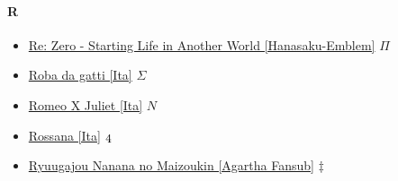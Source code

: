 		\paragraph{R} \hypertarget{SR}{}
			\begin{itemize}
				
				\item \href{https://mega.nz/#F!kHxUTAAY!Z3q-tmj_-emIkQwzSx7dAg} {Re: Zero - Starting Life in Another World [Hanasaku-Emblem]}  $\varPi$ \\ 
				\item \href{https://mega.nz/#F!dn4nGD4R!aXCbKBPY1_SN00BQYdoVkQ} {Roba da gatti [Ita]}  $\Sigma$ \\ 
				\item \href{https://mega.nz/#F!ID5GCQwY!XmmeJI40PzN9gGc6my9pGA} {Romeo X Juliet [Ita]}  $N$ \\ 
				\item \href{https://mega.nz/#F!qSxz1DaZ!M9apUEjzB52xh_pjuqRt1Q} {Rossana [Ita]}  $\oldstylenums{4}$ \\ 
				\item \href{https://mega.nz/#F!mz4SRAYI!SdgjzQkReuybnB93c6BT0Q} {Ryuugajou Nanana no Maizoukin [Agartha Fansub]}  $\ddag$ \\ 
				
			\end{itemize}
				
